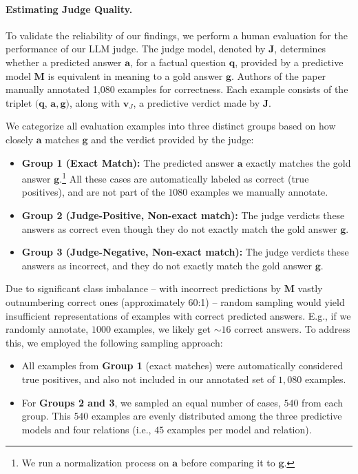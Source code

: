 

\paragraph{Estimating Judge Quality.}
To validate the reliability of our findings, we perform a human evaluation for the performance of our LLM judge. The judge model, denoted by 
$\mathbf{J}$, determines whether a predicted answer $\mathbf{a}$, for a factual question $\mathbf{q}$, provided by a predictive model $\mathbf{M}$ is equivalent in meaning to a gold answer $\mathbf{g}$. 
Authors of the paper manually annotated 1,080 examples for correctness. Each example consists of the triplet $(\mathbf{q}$, $\mathbf{a}, \mathbf{g})$, along with $\mathbf{v}_J$, a predictive verdict made by $\mathbf{J}$.

We categorize all evaluation examples into three distinct groups based on how closely $\mathbf{a}$ matches $\mathbf{g}$ and the verdict provided by the judge:
\begin{itemize}
    \item \textbf{Group 1 (Exact Match):} The predicted answer $\mathbf{a}$ exactly matches the gold answer $\mathbf{g}$.\footnote{We run a normalization process on $\mathbf{a}$ before comparing it to $\mathbf{g}$.} All these cases are automatically labeled as correct (true positives), and are not part of the $1080$ examples we manually annotate.

    \item \textbf{Group 2 (Judge-Positive, Non-exact match):} The judge verdicts these answers as correct even though they do not exactly match the gold answer $\mathbf{g}$.

    \item \textbf{Group 3 (Judge-Negative, Non-exact match):} The judge verdicts these answers as incorrect, and they do not exactly match the gold answer $\mathbf{g}$.
\end{itemize}

Due to significant class imbalance -- with incorrect predictions by $\mathbf{M}$ vastly outnumbering correct ones (approximately 60:1) -- random sampling would yield insufficient representations of examples with correct predicted answers. E.g., if we randomly annotate, $1000$ examples, we likely get $\sim\!\!16$ correct answers. 
To address this, we employed the following sampling approach:
\begin{itemize}
    \item All examples from \textbf{Group 1} (exact matches) were automatically considered true positives, and also not included in our annotated set of $1,080$ examples.

    \item For \textbf{Groups 2 and 3}, we sampled an equal number of cases, $540$ from each group. This $540$ examples are evenly distributed among the three predictive models and four relations (i.e., $45$ examples per model and relation).
    
\end{itemize}

